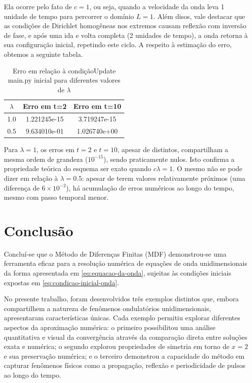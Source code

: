 \documentclass[column,amsmath,amssymb,floatfix]{revtex4}
\begin{document}
Ela ocorre pelo fato de $c=1$, ou seja, quando a velocidade da onda leva 1 unidade de tempo para percorrer o domínio $L=1$. Além disos, vale destacar que as condições de Dirichlet homogêneas nos extremos causam reflexão com inversão de fase, e após uma ida e volta completa (2 unidades de tempo), a onda retorna à sua configuração inicial, repetindo este ciclo. A respeito à estimação do erro, obtemos a seguinte tabela.
\begin{table}[H]
	\centering
	\caption{Erro em relação à condiçãoUpdate main.py inicial para diferentes valores de $\lambda$}
	\label{tab:erro_lambda}
	\renewcommand{\arraystretch}{1.25}
	\setlength{\tabcolsep}{12pt}
	\begin{tabular}{|c|c|c|}
		\hline
		\textbf{$\lambda$} & \textbf{Erro em t=2} & \textbf{Erro em t=10} \\ \hline
		1.0                & 1.221245e-15         & 3.719247e-15          \\ \hline
		0.5                & 9.634010e-01         & 1.026740e+00          \\ \hline
	\end{tabular}
\end{table}

Para $\lambda=1$, os erros em $t=2$ e $t=10$, apesar de distintos, compartilham a mesma ordem de grandeza ($10^{-15}$), sendo praticamente nulos. Isto confirma a propriedade teórica do esquema ser exato quando $c\lambda=1$. O mesmo não se pode dizer em relação à $\lambda=0.5$: apesar de terem valores relativamente próximos (uma diferença de $6\times10^{-2}$), há acumulação de erros numéricos ao longo do tempo, mesmo com passo temporal menor. 

\section{Conclusão}
Concluí-se que o Método de Diferenças Finitas (MDF) demonstrou-se uma ferramenta eficaz para a resolução numérica de equações de onda unidimensionais da forma apresentada em \eqref{eq:equacao-da-onda}, sujeitas às condições iniciais expostas em \eqref{eq:condicao-inicial-onda}.

No presente trabalho, foram desenvolvidos três exemplos distintos que, embora compartilhem a natureza de fenômenos ondulatórios unidimensionais, apresentaram características únicas. Cada exemplo permitiu explorar diferentes aspectos da aproximação numérica: o primeiro possibilitou uma análise quantitativa e visual da convergência através da comparação direta entre soluções exata e numérica; o segundo explorou propriedades de simetria em torno de $x=2$ e sua preservação numérica; e o terceiro demonstrou a capacidade do método em capturar fenômenos físicos como a propagação, reflexão e periodicidade de pulsos ao longo do tempo.
\end{document}
